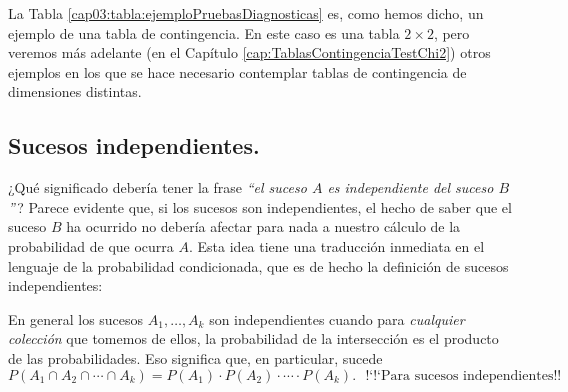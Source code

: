       La Tabla \ref{cap03:tabla:ejemploPruebasDiagnosticas} es, como hemos dicho, un ejemplo de una {\sf tabla de contingencia}. En este caso es una tabla $2\times 2$, pero veremos más adelante (en el Capítulo \ref{cap:TablasContingenciaTestChi2}) otros ejemplos en los que se hace necesario contemplar tablas de contingencia de dimensiones distintas.


\subsection{Sucesos independientes.}
\label{cap03:subsec:SucesosIndependientes}

¿Qué significado debería tener la frase {\em ``el suceso $A$ es independiente del suceso $B$''}\,? Parece evidente que, si los sucesos son independientes, el hecho de saber que el suceso $B$ ha ocurrido no debería afectar para nada a nuestro cálculo de la probabilidad de que ocurra $A$. Esta idea tiene una traducción inmediata en el lenguaje de la probabilidad condicionada, que es de hecho la definición de sucesos independientes:
        \begin{center}
        \end{center}
En general los sucesos $A_1,\ldots,A_k$ son independientes cuando para {\em cualquier colección} que tomemos de ellos, la probabilidad de la intersección es el producto de las probabilidades. Eso significa que, en particular, sucede
    \begin{equation}\label{cap03:ecu:ReglaProductoProbabilidad_N_SucesosIndependientes}
        P(A_1\cap A_2\cap\cdots\cap A_k)=P(A_1) \cdot P(A_2)\cdot\cdots\cdot P(A_k).\mbox{ {!`}{!`}Para sucesos independientes!!}
    \end{equation}
